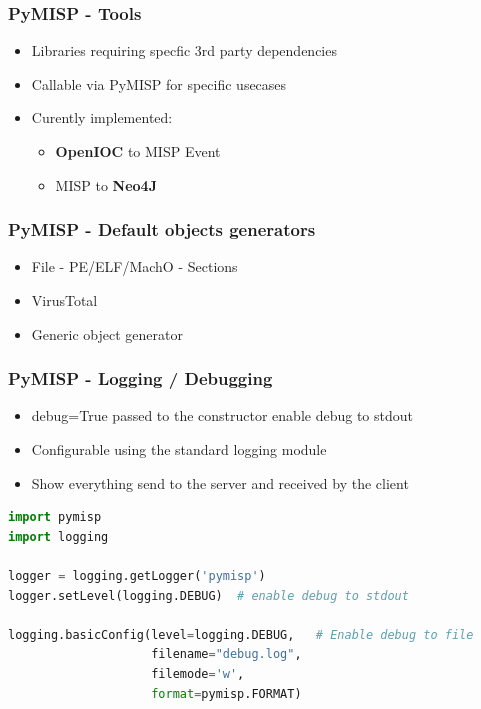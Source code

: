 \begin{frame}[fragile]
    \frametitle{PyMISP - Tools}
    \begin{itemize}
        \item Libraries requiring specfic 3rd party dependencies
        \item Callable via PyMISP for specific usecases
        \item Curently implemented:
        \begin{itemize}
            \item {\bf OpenIOC} to MISP Event
            \item MISP to {\bf Neo4J}
        \end{itemize}
    \end{itemize}
\end{frame}

\begin{frame}[fragile]
    \frametitle{PyMISP - Default objects generators }
    \begin{itemize}
        \item File - PE/ELF/MachO - Sections
        \item VirusTotal
        \item Generic object generator
    \end{itemize}
\end{frame}

\begin{frame}[fragile]
    \frametitle{PyMISP - Logging / Debugging}
    \begin{itemize}
        \item debug=True passed to the constructor enable debug to stdout
        \item Configurable using the standard logging module
        \item Show everything send to the server and received by the client
    \end{itemize}
\begin{adjustbox}{width=\textwidth,height=3cm,keepaspectratio}
    \begin{lstlisting}[language=Python,firstnumber=1]
import pymisp
import logging

logger = logging.getLogger('pymisp')
logger.setLevel(logging.DEBUG)  # enable debug to stdout

logging.basicConfig(level=logging.DEBUG,   # Enable debug to file
                    filename="debug.log",
                    filemode='w',
                    format=pymisp.FORMAT)
    \end{lstlisting}
\end{adjustbox}
\end{frame}


